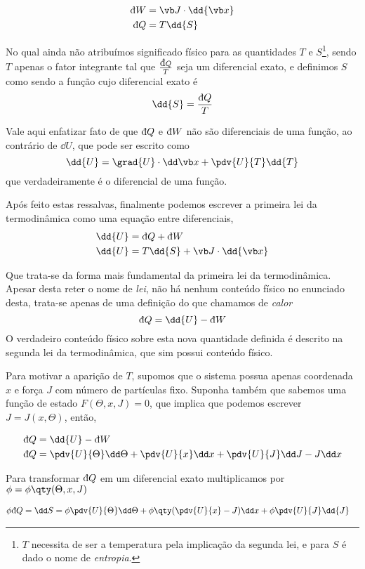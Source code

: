 \documentclass[twoside,reqno]{amsart}
\newcommand{\dbar}{\mbox{\dj}}
\numberwithin{equation}{section}
\begin{document}
\begin{refsection}
\begin{align}
    \dbar W&=\vb J\cdot\dd{\vb x}\\
    \dbar Q&=T\dd{S}
\end{align}

No qual ainda não atribuímos significado físico para as quantidades $T$ e $S$\footnote{$T$ necessita de ser a temperatura pela implicação da segunda lei, e para $S$ é dado o nome de \emph{entropia}.}, sendo $T$ apenas o fator integrante tal que 
$\frac{\dbar Q}{T}$ seja um diferencial exato, e definimos $S$ como sendo a função cujo diferencial exato é $$\dd{S}=\frac{\dbar Q}{T}$$

Vale aqui enfatizar fato de que $\dbar Q$ e $\dbar W$ não são diferenciais de uma função, ao contrário de $\dd{U}$, que 
pode ser escrito como $$\dd{U}=\grad{U}\cdot\dd\vb x+\pdv{U}{T}\dd{T}$$ que verdadeiramente é o diferencial de uma função.

Após feito estas ressalvas, finalmente podemos escrever a primeira lei da termodinâmica como uma equação entre diferenciais,
\begin{align}
    \dd{U}&=\dbar Q+\dbar W\\
    \dd{U}&=T\dd{S}+\vb J\cdot \dd{\vb x}
\end{align}

Que trata-se da forma mais fundamental da primeira lei da termodinâmica. Apesar desta reter o nome de \emph{lei}, não há nenhum 
conteúdo físico no enunciado desta, trata-se apenas de uma definição do que chamamos de \emph{calor} $$\dbar Q=\dd{U}-\dbar W$$ O 
verdadeiro conteúdo físico sobre esta nova quantidade definida é descrito na segunda lei da termodinâmica, que sim possui conteúdo 
físico.

Para motivar a aparição de $T$, supomos que o sistema possua apenas coordenada $x$ e força $J$ com número de partículas fixo. 
Suponha também que sabemos uma função de estado $F(\Theta,x,J)=0$, que implica que podemos escrever $J=J(x,\Theta)$, então,

\begin{align}
    \dbar Q&=\dd{U}-\dbar W\\
    \dbar Q&=\pdv{U}{\Theta}\dd\Theta+\pdv{U}{x}\dd x+\pdv{U}{J}\dd J-J\dd x\\
\end{align}

Para transformar $\dbar Q$ em um diferencial exato multiplicamos por $\phi=\phi\qty(\Theta,x,J)$

\begin{align}
    \phi\dbar Q=\dd S&=\phi\pdv{U}{\Theta}\dd\Theta+\phi\qty(\pdv{U}{x}-J)\dd x+\phi\pdv{U}{J}\dd{J}
\end{align}


\end{refsection}
\end{document}
